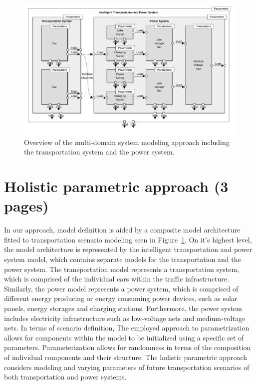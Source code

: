\begin{figure}[h]
	\centering
	\includegraphics[width=\textwidth]{../gfx/model2.pdf}
	\caption{Overview of the multi-domain system modeling approach including the transportation system and the power system.}
	\label{fig:model}
\end{figure}

\section{Holistic parametric approach (3 pages)}
\label{section:contribution_1}

In our approach, model definition is aided by a composite model architecture fitted to transportation scenario modeling seen in Figure~\ref{fig:model}. On it's highest level, the model architecture is represented by the intelligent transportation and power system model, which contains separate models for the transportation and the power system. The transportation model represents a transportation system, which is comprised of the individual cars within the traffic infrastructure. Similarly, the power model represents a power system, which is comprised of different energy producing or energy consuming power devices, such as solar panels, energy storages and charging stations. Furthermore, the power system includes electricity infrastructure such as low-voltage nets and medium-voltage nets. In terms of scenario definition, The employed approach to parametrization allows for components within the model to be initialized using a specific set of parameters. Parameterization allows for randomness in terms of the composition of individual components and their structure. The holistic parametric approach considers modeling and varying parameters of future transportation scenarios of both transportation and power systems.

